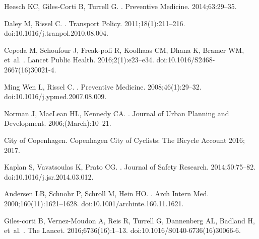 \documentclass[10pt,letterpaper]{article}
\begin{document}
\begin{thebibliography}{}
Heesch KC, Giles-Corti B, Turrell G.
.
\newblock Preventive Medicine. 2014;63:29--35.

Daley M, Rissel C.
.
\newblock Transport Policy. 2011;18(1):211--216.
\newblock doi:{10.1016/j.tranpol.2010.08.004}.

Cepeda M, Schoufour J, Freak-poli R, Koolhaas CM, Dhana K, Bramer WM, et~al.
.
\newblock Lancet Public Health. 2016;2(1):e23--e34.
\newblock doi:{10.1016/S2468-2667(16)30021-4}.

{Ming Wen} L, Rissel C.
.
\newblock Preventive Medicine. 2008;46(1):29--32.
\newblock doi:{10.1016/j.ypmed.2007.08.009}.

Norman J, MacLean HL, Kennedy CA.
.
\newblock Journal of Urban Planning and Development. 2006;(March):10--21.

{City of Copenhagen}. {Copenhagen City of Cyclists: The Bicycle Account 2016};
  2017.

Kaplan S, Vavatsoulas K, Prato CG.
.
\newblock Journal of Safety Research. 2014;50:75--82.
\newblock doi:{10.1016/j.jsr.2014.03.012}.

Andersen LB, Schnohr P, Schroll M, Hein HO.
.
\newblock Arch Intern Med. 2000;160(11):1621--1628.
\newblock doi:{10.1001/archinte.160.11.1621}.

Giles-corti B, Vernez-Moudon A, Reis R, Turrell G, Dannenberg AL, Badland H,
  et~al.
.
\newblock The Lancet. 2016;6736(16):1--13.
\newblock doi:{10.1016/S0140-6736(16)30066-6}.


\end{thebibliography}
\end{document}
